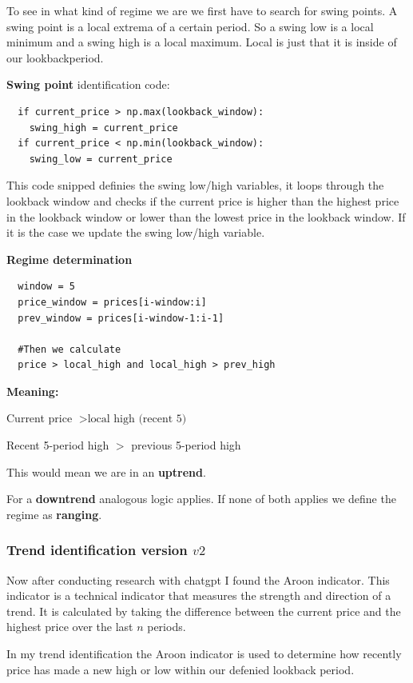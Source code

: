 \documentclass[12pt]{article}
\begin{document}
To see in what kind of regime we are we first have to search for swing points. A swing point is a local extrema of a certain period. So a swing low is a local minimum and a swing high is a local maximum. Local is just that it is inside of our lookbackperiod.

\textbf{Swing point} identification code:

\begin{verbatim}
  if current_price > np.max(lookback_window):
    swing_high = current_price
  if current_price < np.min(lookback_window):
    swing_low = current_price
\end{verbatim}

This code snipped definies the swing low/high variables, it loops through the lookback window and checks if the current price is higher than the highest price in the lookback window or lower than the lowest price in the lookback window. If it is the case we update the swing low/high variable.




\textbf{Regime determination} 

\begin{verbatim}
  window = 5
  price_window = prices[i-window:i]
  prev_window = prices[i-window-1:i-1]

  #Then we calculate
  price > local_high and local_high > prev_high
\end{verbatim}

\textbf{Meaning:}

Current price $> \text{local high (recent 5)}$

Recent 5-period high $>$ previous 5-period high

This would mean we are in an \textbf{uptrend}.

For a \textbf{downtrend} analogous logic applies. If none of both applies we define the regime as \textbf{ranging}.



\subsubsection{Trend identification version $v2$}
Now after conducting research with chatgpt I found the Aroon indicator. This indicator is a technical indicator that measures the strength and direction of a trend. It is calculated by taking the difference between the current price and the highest price over the last $n$ periods.

In my trend identification the Aroon indicator is used to determine how recently price has made a new high or low within our defenied lookback period.
\end{document}
